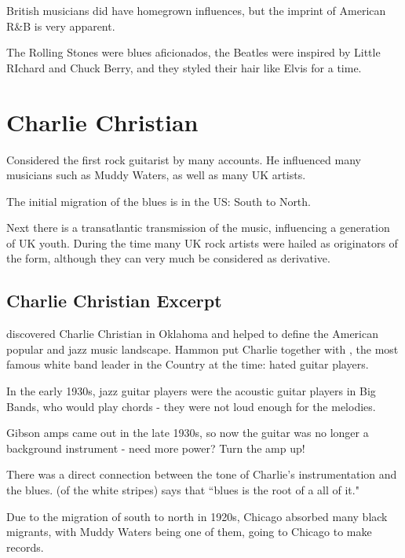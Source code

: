 \documentclass[12pt, a4paper, twoside, openright, titlepage]{book}
\begin{document}
\begin{note}{}{}
    British musicians did have homegrown influences, but the imprint of American R\&B is very apparent.
\end{note}

\begin{eg}{}{}
    The Rolling Stones were blues aficionados, the Beatles were inspired by Little RIchard and Chuck Berry, and they styled their hair like Elvis for a time.
\end{eg}


\section{Charlie Christian}

Considered the first rock guitarist by many accounts. He influenced many musicians such as Muddy Waters, as well as many UK artists.

\begin{note}{}{}
    The initial migration of the blues is in the US: South to North.

    Next there is a transatlantic transmission of the music, influencing a generation of UK youth. During the time many UK rock artists were hailed as originators of the form, although they can very much be considered as derivative.
\end{note}

\subsection{Charlie Christian Excerpt}

 discovered Charlie Christian in Oklahoma and helped to define the American popular and jazz music landscape. Hammon put Charlie together with , the most famous white band leader in the Country at the time: hated guitar players. 


In the early 1930s, jazz guitar players were the acoustic guitar players in Big Bands, who would play chords - they were not loud enough for the melodies.

Gibson amps came out in the late 1930s, so now the guitar was no longer a background instrument - need more power? Turn the amp up!

There was a direct connection between the tone of Charlie's instrumentation and the blues.  (of the white stripes) says that ``blues is the root of a all of it."

Due to the migration of south to north in 1920s, Chicago absorbed many black migrants, with Muddy Waters being one of them, going to Chicago to make records.
\end{document}
